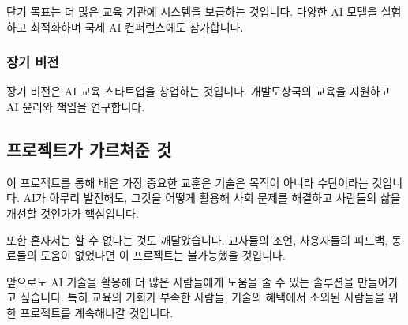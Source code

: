 단기 목표는 더 많은 교육 기관에 시스템을 보급하는 것입니다. 다양한 AI 모델을 실험하고 최적화하며 국제 AI 컨퍼런스에도 참가합니다.

\subsubsection{장기 비전}

장기 비전은 AI 교육 스타트업을 창업하는 것입니다. 개발도상국의 교육을 지원하고 AI 윤리와 책임을 연구합니다.

\subsection{프로젝트가 가르쳐준 것}

이 프로젝트를 통해 배운 가장 중요한 교훈은 기술은 목적이 아니라 수단이라는 것입니다. AI가 아무리 발전해도, 그것을 어떻게 활용해 사회 문제를 해결하고 사람들의 삶을 개선할 것인가가 핵심입니다.

또한 혼자서는 할 수 없다는 것도 깨달았습니다. 교사들의 조언, 사용자들의 피드백, 동료들의 도움이 없었다면 이 프로젝트는 불가능했을 것입니다.

앞으로도 AI 기술을 활용해 더 많은 사람들에게 도움을 줄 수 있는 솔루션을 만들어가고 싶습니다. 특히 교육의 기회가 부족한 사람들, 기술의 혜택에서 소외된 사람들을 위한 프로젝트를 계속해나갈 것입니다.